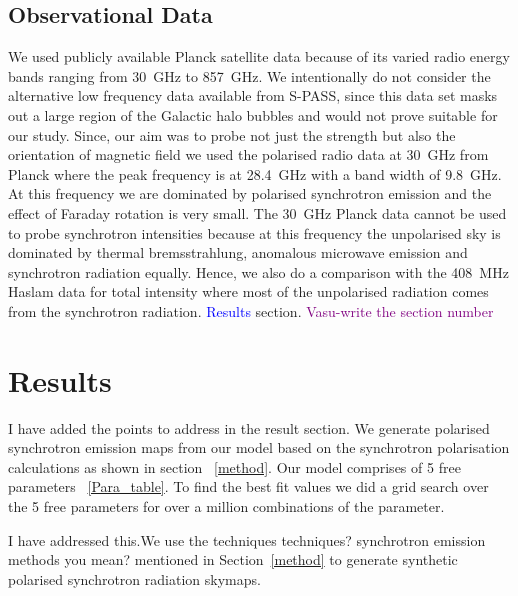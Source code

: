 \documentclass[12pt, a4 paper]{article}
\newcommand{\Andrew}[1]{\textcolor{dg}{#1}}
\newcommand{\Vasu}[1]{{\color{purple}#1}}
\begin{document}

\subsection{Observational Data}
We used publicly available Planck satellite data because of its varied radio energy bands ranging from 30~GHz to 857~GHz. We intentionally do not consider the alternative low frequency data available from S-PASS, since this data set masks out a large region of the Galactic halo bubbles and would not prove suitable for our study. Since, our aim was to probe not just the strength but also the orientation of magnetic field we used the polarised radio data at 30~GHz from Planck where the peak frequency is at 28.4~GHz with a band width of 9.8~GHz. At this frequency we are dominated by polarised synchrotron emission and the effect of Faraday rotation is very small. %
The 30~GHz Planck data cannot be used to probe synchrotron intensities because at this frequency the unpolarised sky is dominated by thermal bremsstrahlung, anomalous microwave emission and synchrotron radiation equally. Hence, we also do a comparison with the 408~MHz Haslam data for total intensity where most of the unpolarised radiation comes from the synchrotron radiation.
 \textcolor{blue}{Results} section.
\textcolor{purple}{Vasu-write the section number}

\clearpage
\newpage
\section{Results}

\Vasu{I have added the points to address in the result section.}
We generate polarised synchrotron emission maps from our model based on the synchrotron polarisation calculations as shown in section ~\ref{method}. Our model comprises of 5 free parameters ~\ref{Para_table}. To find the best fit values we did a grid search over the 5 free parameters for over a million combinations of the parameter.

\Vasu{I have addressed this.}We use the techniques \Andrew{techniques? synchrotron emission methods you mean?} mentioned in Section~\ref{method} to generate synthetic polarised synchrotron radiation skymaps. 
\end{document}
